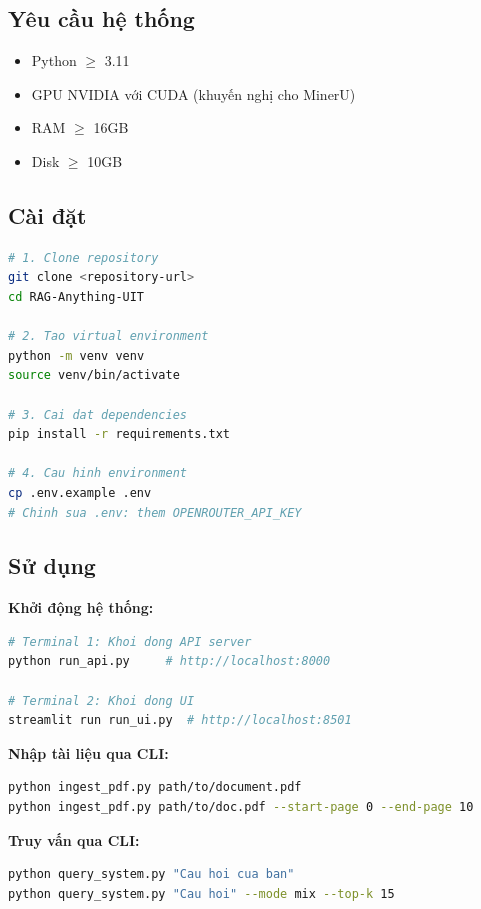 \documentclass[12pt,a4paper]{article}
\begin{document}
\subsection{Yêu cầu hệ thống}

\begin{itemize}
  \item Python $\geq$ 3.11
  \item GPU NVIDIA với CUDA (khuyến nghị cho MinerU)
  \item RAM $\geq$ 16GB
  \item Disk $\geq$ 10GB
\end{itemize}

\subsection{Cài đặt}

\begin{lstlisting}[language=bash,caption={Các bước cài đặt}]
# 1. Clone repository
git clone <repository-url>
cd RAG-Anything-UIT

# 2. Tao virtual environment
python -m venv venv
source venv/bin/activate

# 3. Cai dat dependencies
pip install -r requirements.txt

# 4. Cau hinh environment
cp .env.example .env
# Chinh sua .env: them OPENROUTER_API_KEY
\end{lstlisting}

\subsection{Sử dụng}

\textbf{Khởi động hệ thống:}

\begin{lstlisting}[language=bash]
# Terminal 1: Khoi dong API server
python run_api.py     # http://localhost:8000

# Terminal 2: Khoi dong UI
streamlit run run_ui.py  # http://localhost:8501
\end{lstlisting}

\textbf{Nhập tài liệu qua CLI:}

\begin{lstlisting}[language=bash]
python ingest_pdf.py path/to/document.pdf
python ingest_pdf.py path/to/doc.pdf --start-page 0 --end-page 10
\end{lstlisting}

\textbf{Truy vấn qua CLI:}

\begin{lstlisting}[language=bash]
python query_system.py "Cau hoi cua ban"
python query_system.py "Cau hoi" --mode mix --top-k 15
\end{lstlisting}
\end{document}
